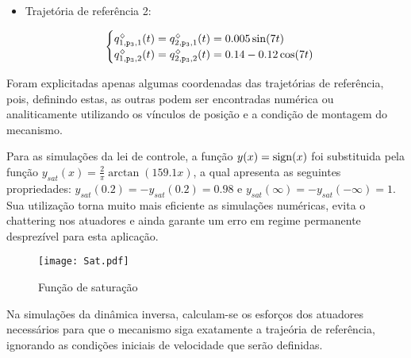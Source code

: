 \begin{itemize}
\item Trajet\'oria de refer\^encia 2:

$$ \begin{cases}
q_{1,\mathtt{p}_3,1}^{\scriptscriptstyle \diamondsuit}(t) = q_{2,\mathtt{p}_3,1}^{\scriptscriptstyle \diamondsuit}(t) = 0.005 \sin(7t) \\
q_{1,\mathtt{p}_3,2}^{\scriptscriptstyle \diamondsuit}(t) = q_{2,\mathtt{p}_3,2}^{\scriptscriptstyle \diamondsuit}(t) = 0.14 - 0.12 \cos(7t) \\
\end{cases}$$

\end{itemize}

Foram explicitadas apenas algumas coordenadas das trajet\'orias de refer\^encia, pois, definindo estas, as outras podem ser encontradas num\'erica ou analiticamente utilizando os v\'inculos de posi\c{c}\~ao e a condi\c{c}\~ao de montagem do mecanismo.

Para as simula\c{c}\~oes da lei de controle, a fun\c{c}\~ao $y(x) = \operatorname*{sign}(x)$ foi substituida pela fun\c{c}\~ao $y_{sat}(x) = \frac{2}{\pi}\arctan(159.1 x)$, a qual apresenta as seguintes propriedades: $y_{sat}(0.2) = -y_{sat}(0.2) = 0.98$ e $y_{sat}(\infty) = - y_{sat}(-\infty) = 1$. Sua utiliza\c{c}\~ao torna muito mais eficiente as simula\c{c}\~oes num\'ericas, evita o chattering nos atuadores e ainda garante um erro em regime permanente desprez\'ivel para esta aplica\c{c}\~ao.

\begin{figure}[H]
	\centering
	\texttt{[image: Sat.pdf]}
	\caption{Fun\c{c}\~ao de satura\c{c}\~ao}
	\label{Sat}
\end{figure}

Na simula\c{c}\~oes da din\^amica inversa, calculam-se os esfor\c{c}os dos atuadores necess\'arios para que o mecanismo siga exatamente a traje\'oria de refer\^encia, ignorando as condi\c{c}\~oes iniciais de velocidade que ser\~ao definidas.


